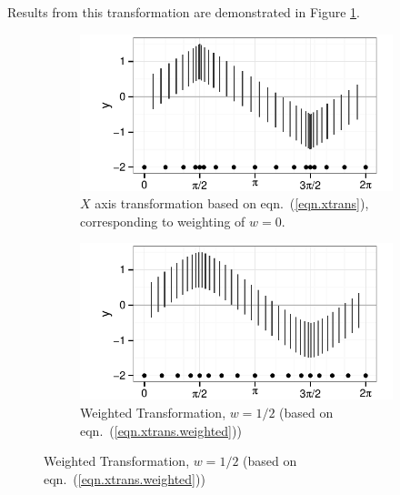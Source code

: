 \documentclass[11pt]{isuthesis}\usepackage[]{graphicx}\usepackage[]{color}
\begin{document}
Results from this transformation are demonstrated in Figure \ref{fig:xtrans1}.
 



\begin{figure}[h!tbp]\centering
\begin{subfigure}[b]{.45\textwidth}\centering 
\includegraphics[keepaspectratio=TRUE,width=\textwidth]{fig-xtransform1}
\caption[$X$ axis transformation]{$X$ axis transformation based on eqn.~(\ref{eqn.xtrans}), corresponding to weighting of $w=0$.}
\label{fig:xtrans1}
\end{subfigure} \hfill\hfill
\begin{subfigure}[b]{.45\textwidth}\centering
\includegraphics[keepaspectratio=TRUE,width=\textwidth]{fig-xtransform2} 
\caption[Weighted transformation]{Weighted Transformation, $w=1/2$ (based on eqn.~(\ref{eqn.xtrans.weighted}))}
\label{fig:xtrans2}
\end{subfigure}


\end{figure}
\end{document}
